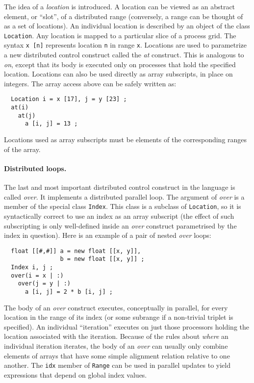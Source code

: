 The idea of a {\em location} is introduced.  A
location can be viewed as an abstract element, or ``slot'', of a
distributed range
(conversely, a range can be thought of as a set of locations).
An individual location is described by an object of the class {\tt Location}.
Any location is mapped to a particular slice of a process grid.
The syntax {\tt x\,[n]} represents location {\tt n} in range {\tt x}.
Locations are used to parametrize a new distributed control
construct called the {\em at} construct.  This
is analogous to {\em on}, except that its
body is executed only on processes that hold the specified location.
Locations can also be used directly as array subscripts, in place on
integers.  The array access above can be safely written as:
\small
\begin{verbatim}
  Location i = x [17], j = y [23] ;
  at(i)
    at(j)
      a [i, j] = 13 ;
\end{verbatim}
\normalsize
Locations used as array subscripts must be elements of the
corresponding ranges of the array.

\paragraph{Distributed loops.}

The last and most important distributed control construct in the language
is called {\em over}.
It implements a distributed parallel loop.
The argument of {\em over} is a member of the special class {\tt Index}.
This class is a subclass of {\tt Location}, so it is syntactically
correct to use an index as an array subscript (the effect
of such subscripting is only well-defined inside an {\em over} construct
parametrised by the index in question).  Here is an example of
a pair of nested {\em over} loops:
\small
\begin{verbatim}
  float [[#,#]] a = new float [[x, y]],
                b = new float [[x, y]] ;
  Index i, j ;
  over(i = x | :)
    over(j = y | :)
      a [i, j] = 2 * b [i, j] ;
\end{verbatim}
\normalsize
The body of an {\em over} construct executes, conceptually in parallel,
for every location in the range of its index (or some subrange if a
non-trivial triplet is specified).  An individual
``iteration'' executes on just those processors holding the location
associated with the iteration.  Because of the rules about {\em
where} an individual iteration iterates, the body of an {\em over} can
usually only combine elements of arrays that have some simple
alignment relation relative to one another.  The {\tt idx} member of
{\tt Range} can be used in parallel updates to yield expressions that depend
on global index values.

